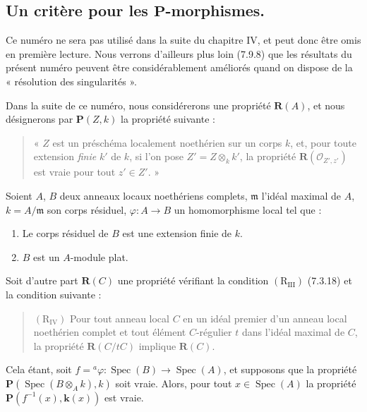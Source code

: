 \subsection{\texorpdfstring{Un critère pour les $\boldsymbol P$-morphismes.}{Un critère pour les P-morphismes}}
\label{subsection:IV.7.5-fr}

\begin{env}[7.5.0]
\label{IV.2.s7.5.0-fr}
Ce numéro ne sera pas utilisé dans la suite du chapitre IV, et peut donc être
omis en première lecture. Nous verrons d'ailleurs plus loin (7.9.8) que les
résultats du présent numéro peuvent être considérablement améliorés quand on
dispose de la « résolution des singularités ».

Dans la suite de ce numéro, nous considérerons une propriété
$\boldsymbol R(A)$, et nous désignerons par $\boldsymbol P(Z,k)$ la propriété
suivante :
\begin{quote}
« $Z$ est un préschéma localement noethérien sur un corps $k$, et, pour toute
extension \emph{finie} $k'$ de $k$, si l'on pose $Z'=Z\otimes_k k'$, la propriété
$\boldsymbol R(\mathscr O_{Z',z'})$ est vraie pour tout $z'\in Z'$. »
\end{quote}
\end{env}

\begin{theorem}[7.5.1]
\label{IV.2.s7.5.1-fr}
Soient $A$, $B$ deux anneaux locaux noethériens \textup{complets}, $\mathfrak m$
l'idéal maximal de $A$, $k=A/\mathfrak m$ son corps résiduel,
$\varphi:A\to B$ un homomorphisme local tel que :
\begin{enumerate}
\item[\emph{(i)}] Le corps résiduel de $B$ est une extension finie de $k$.
\item[\emph{(ii)}] $B$ est un $A$-module plat.
\end{enumerate}
Soit d'autre part $\boldsymbol R(C)$ une propriété vérifiant la condition
$(\mathrm R_{\mathrm{III}})$ (7.3.18) et la condition suivante :
\begin{quote}
$(\mathrm R_{\mathrm{IV}})$ Pour tout anneau local $C$ en un idéal premier
d'un anneau local noethérien complet et tout élément $C$-régulier $t$ dans
l'idéal maximal de $C$, la propriété $\boldsymbol R(C/tC)$ implique
$\boldsymbol R(C)$.
\end{quote}


Cela étant, soit $f={}^a\varphi:\operatorname{Spec}(B)\to
\operatorname{Spec}(A)$, et supposons que la propriété
$\boldsymbol P(\operatorname{Spec}(B\otimes_A k),k)$ soit vraie. Alors, pour
tout $x\in\operatorname{Spec}(A)$ la propriété
$\boldsymbol P(f^{-1}(x),\boldsymbol{k}(x))$ est vraie.
\end{theorem}

